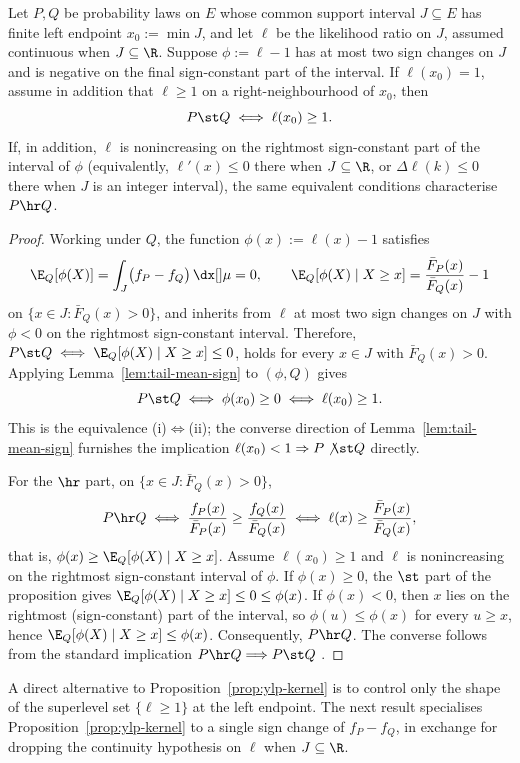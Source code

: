 \documentclass[11pt]{article}
\begin{document}
\begin{prop}
\label{prop:ylp-kernel}
Let \(P,Q\) be probability laws on \(E\) whose common support interval \(J\subseteq E\) has finite left endpoint \(x_0:=\min J\), and let \(\ell\) be the likelihood ratio on \(J\), assumed continuous when \(J\subseteq\R\). Suppose \(\phi:=\ell-1\) has at most two sign changes on \(J\) and is negative
on the final sign-constant part of the interval. If \(\ell(x_0)=1\), assume in addition that \(\ell\ge 1\) on a right-neighbourhood of \(x_0\), then
\[
P\st Q \iff \ell(x_0)\ge 1.
\]
If, in addition, $\ell$ is nonincreasing on the rightmost sign-constant part of the interval of $\phi$ (equivalently, $\ell'(x)\le 0$ there when $J\subseteq\R$, or $\Delta\ell(k)\le 0$ there when $J$ is an integer interval), the same equivalent conditions characterise $P\hr Q$.
\end{prop}

\begin{proof}
Working under $Q$, the function $\phi(x):=\ell(x)-1$ satisfies
\[
\E_Q[\phi(X)]=\int_J\bigl(f_P-f_Q\bigr)\,\dx[]\mu=0, \qquad \E_Q[\phi(X)\mid X\ge x]=\frac{\bar F_P(x)}{\bar F_Q(x)}-1
\]
on $\{x\in J:\bar F_Q(x)>0\}$, and inherits from $\ell$ at most two sign changes on $J$ with $\phi<0$ on the rightmost sign-constant interval. Therefore,  $P\st Q\iff \E_Q[\phi(X)\mid X\ge x]\le 0$, holds for every $x\in J\text{ with }\bar F_Q(x)>0$. Applying Lemma~\ref{lem:tail-mean-sign} to $(\phi,Q)$ gives
\[
P\st Q\iff \phi(x_0)\ge 0\iff \ell(x_0)\ge 1.
\]
This is the equivalence (i)$\Leftrightarrow$(ii); the converse direction of Lemma~\ref{lem:tail-mean-sign} furnishes the implication $\ell(x_0)<1\Rightarrow P\not\st Q$ directly.

For the $\hr$ part, on $\{x\in J:\bar F_Q(x)>0\}$,
\[
P\hr Q\iff \frac{f_P(x)}{\bar F_P(x)}\ge\frac{f_Q(x)}{\bar F_Q(x)} \iff \ell(x)\ge\frac{\bar F_P(x)}{\bar F_Q(x)},
\]
that is, $\phi(x)\ge \E_Q[\phi(X)\mid X\ge x]$. Assume $\ell(x_0)\ge 1$ and $\ell$ is nonincreasing on the rightmost sign-constant interval of $\phi$. If $\phi(x)\ge 0$, the $\st$ part of the proposition gives $\E_Q[\phi(X)\mid X\ge x]\le 0\le \phi(x)$. If $\phi(x)<0$, then $x$ lies on the rightmost  (sign-constant) part of the interval, so $\phi(u)\le \phi(x)$ for every $u\ge x$, hence $\E_Q[\phi(X)\mid X\ge x]\le \phi(x)$. Consequently, $P\hr Q$. The converse follows from the standard implication $P\hr Q\Longrightarrow P\st Q$ \cite{ShakedShanthikumar}.
\end{proof}

A direct alternative to Proposition~\ref{prop:ylp-kernel} is to control only the shape of the superlevel set \(\{\ell\ge 1\}\) at the left endpoint. The next result specialises Proposition~\ref{prop:ylp-kernel} to a single sign change of $f_P-f_Q$, in exchange for dropping the continuity hypothesis on $\ell$ when $J\subseteq\R$.
\end{document}
